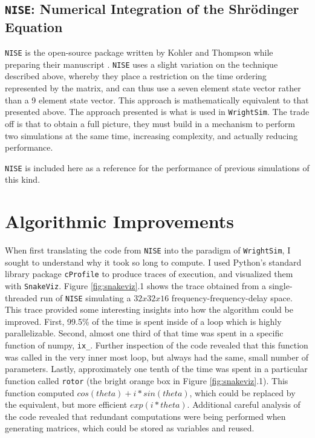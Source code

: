 \documentclass[fontsize=11pt]{scrartcl}
\numberwithin{equation}{section}		%
\numberwithin{figure}{section}			%
\numberwithin{table}{section}				%
\begin{document}
\subsection{\texttt{NISE}: Numerical Integration of the Shr{\"o}dinger Equation}

\texttt{NISE} \cite{nise} is the open-source package written by Kohler and Thompson while preparing their manuscript \cite{Kohler_2017}.
\texttt{NISE} uses a slight variation on the technique described above, whereby they place a restriction on the time ordering represented by the matrix, and can thus use a seven element state vector rather than a 9 element state vector.
This approach is mathematically equivalent to that presented above.
The approach presented is what is used in \texttt{WrightSim}.
The trade off is that to obtain a full picture, they must build in a mechanism to perform two simulations at the same time, increasing complexity, and actually reducing performance.

\texttt{NISE} is included here as a reference for the performance of previous simulations of this kind.

\section{Algorithmic Improvements}

When first translating the code from \texttt{NISE} into the paradigm of \texttt{WrightSim}, I sought to understand why it took so long to compute.
I used Python's standard library package \texttt{cProfile} to produce traces of execution, and visualized them with \texttt{SnakeViz}\cite{snakeviz}.
Figure \ref{fig:snakeviz}.1 shows the trace obtained from a single-threaded run of \texttt{NISE} simulating a $32 x 32 x 16$ frequency-frequency-delay space.
This trace provided some interesting insights into how the algorithm could be improved.
First, 99.5\% of the time is spent inside of a loop which is highly parallelizable. 
Second, almost one third of that time was spent in a specific function of numpy, \texttt{ix\_}.
Further inspection of the code revealed that this function was called in the very inner most loop, but always had the same, small number of parameters.
Lastly, approximately one tenth of the time was spent in a particular function called \texttt{rotor} (the bright orange box in Figure \ref{fig:snakeviz}.1).
This function computed $cos(theta) + i * sin(theta)$, which could be replaced by the equivalent, but more efficient $exp(i * theta)$.
Additional careful analysis of the code revealed that redundant computations were being performed when generating matrices, which could be stored as variables and reused.
\end{document}
